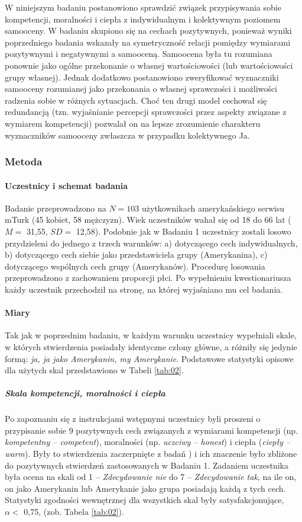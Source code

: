 \documentclass[man]{apa6}
\begin{document}
W niniejszym badaniu postanowiono sprawdzić związek przypisywania sobie kompetencji, moralności i ciepła z indywidualnym i kolektywnym poziomem samooceny. W badaniu skupiono się na cechach pozytywnych, ponieważ wyniki poprzedniego badania wskazały na symetryczność relacji pomiędzy wymiarami pozytywnymi i negatywnymi a samooceną. Samoocena była tu rozumiana ponownie jako ogólne przekonanie o własnej wartościowości (lub wartościowości grupy własnej). Jednak dodatkowo postanowiono zweryfikować wyznaczniki samooceny rozumianej jako przekonania o własnej sprawczości i możliwości radzenia sobie w różnych sytuacjach. Choć ten drugi model cechował się redundancją (tzn. wyjaśnianie percepcji sprawczości przez aspekty związane z wymiarem kompetencji) pozwalał on na lepsze zrozumienie charakteru wyznaczników samooceny zwłaszcza w przypadku kolektywnego Ja.\\

\subsubsection{Metoda}

\paragraph{Uczestnicy i schemat badania}
Badanie przeprowadzono na $N=103$ użytkownikach amerykańskiego serwisu mTurk (45 kobiet, 58 mężczyzn). Wiek uczestników wahał się od 18 do 66 lat ($M=$ 31,55, $SD=$ 12,58). Podobnie jak w Badaniu 1 uczestnicy zostali losowo przydzieleni do jednego z trzech warunków: a) dotyczącego cech indywidualnych, b) dotyczącego cech siebie jako przedstawiciela grupy (Amerykanina), c) dotyczącego wspólnych cech grupy (Amerykanów). Procedurę losowania przeprowadzono z zachowaniem proporcji płci. Po wypełnieniu kwestionariusza każdy uczestnik przechodził na stronę, na której wyjaśniano mu cel badania.

\paragraph{Miary}
Tak jak w poprzednim badaniu, w każdym warunku uczestnicy wypełniali skale, w których stwierdzenia posiadały identyczne człony główne, a różniły się jedynie formą: \emph{ja, ja jako Amerykanin, my Amerykanie}. Podstawowe statystyki opisowe dla użytych skal przedstawiono w Tabeli \ref{tab:02}.

\subparagraph{Skala kompetencji, moralności i ciepła}
Po zapoznaniu się z instrukcjami wstępnymi uczestnicy byli proszeni o przypisanie sobie 9 pozytywnych cech związanych z wymiarami kompetencji (np. \emph{kompetentny -- competent}), moralności (np. \emph{uczciwy -- honest}) i ciepła (\emph{ciepły -- warm}). Były to stwierdzenia zaczerpnięte z badań \textcite{leach2007group}) i ich znaczenie było zbliżone do pozytywnych stwierdzeń zastosowanych w Badaniu 1. Zadaniem uczestnika była ocena na skali od 1 -- \emph{Zdecydowanie nie} do 7 -- \emph{Zdecydowanie tak}, na ile on, on jako Amerykanin lub Amerykanie jako grupa posiadają każdą z tych cech. Statystyki zgodności wewnętrznej dla wszystkich skal były satysfakcjonujące, $\alpha <$ 0,75, (zob. Tabela \ref{tab:02}). \\
\end{document}
